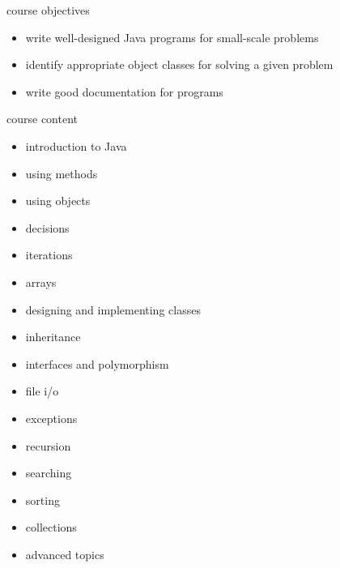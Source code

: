 \documentclass[10pt]{beamer}
\begin{document}
  \begin{frame}{course objectives}
    \begin{itemize}
      \item write well-designed Java programs for small-scale problems
      \item identify appropriate object classes for solving a given problem
      \item write good documentation for programs
    \end{itemize}

  \end{frame}

  \begin{frame}{course content}
    \begin{itemize}
      \item introduction to Java
      \item using methods
      \item using objects
      \item decisions
      \item iterations
      \item arrays
      \item designing and implementing classes
      \item inheritance
      \item interfaces and polymorphism
      \item file i/o
      \item exceptions
      \item recursion
      \item searching
      \item sorting
      \item collections
      \item advanced topics
    \end{itemize}

  \end{frame}
\end{document}
